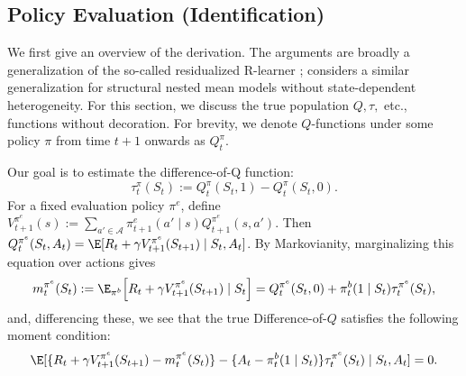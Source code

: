 \documentclass[opre,nonblindrev]{informs4}
\newenvironment{revision}{\begingroup\color{revisionblue}\ignorespaces}{\endgroup}
\providecommand{\cA}{\mathcal A}
\newcommand{\blipadv}{\tau}
\begin{document}
\subsection{Policy Evaluation (Identification)}
We first give an overview of the derivation. The arguments are broadly a generalization of the so-called residualized R-learner \citep{nie2021quasi}; \citep{lewis2021double} considers a similar generalization for structural nested mean models without state-dependent heterogeneity. For this section, we discuss the true population $Q,\blipadv,$ etc., functions without decoration. For brevity, we denote $Q$-functions under some policy $\pi$ from time $t+1$ onwards as $Q_t^\pi$. 



Our goal is to estimate the difference-of-Q function: 
\begin{equation}
    \blipadv_t^\pi(S_t) :=  Q_t^\pi(S_t, 1) - Q_t^\pi(S_t, 0).
\end{equation} 
\begin{revision}
For a fixed evaluation policy $\pi^e$, define
$V_{t+1}^{\pi^e}(s)
:=
\sum_{a'\in\cA}
\pi_{t+1}^e(a'\mid s)Q_{t+1}^{\pi^e}(s,a')$.
Then $Q_t^{\pi^e}(S_t,A_t)
=
\E[
R_t+\gamma V_{t+1}^{\pi^e}(S_{t+1})
\mid S_t,A_t
]$. By Markovianity, marginalizing this equation over actions gives
\begin{equation}
 m_t^{\pi^e}(S_t)
 :={}
 \E_{\pi^b}\!\left[
 R_t+\gamma V_{t+1}^{\pi^e}(S_{t+1})\mid S_t
 \right]
=Q_t^{\pi^e}(S_t,0)
 +\pi_t^b(1\mid S_t)\blipadv_t^{\pi^e}(S_t),
 \label{eq:diff-m-main}
\end{equation}
and, differencing these, we see that the true Difference-of-$Q$ satisfies the following moment condition:
\begin{equation}
\E[
\{R_t+\gamma V_{t+1}^{\pi^e}(S_{t+1})-m_t^{\pi^e}(S_t)\}
-\{A_t-\pi_t^b(1\mid S_t)\}\blipadv_t^{\pi^e}(S_t)
\mid S_t,A_t
]=0.
\label{eq:diff-moment-main}
\end{equation}
\end{revision}
\end{document}
